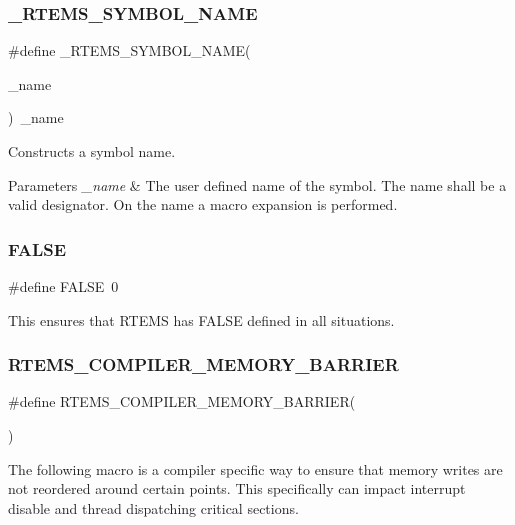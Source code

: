 \subsubsection{\texorpdfstring{\_RTEMS\_SYMBOL\_NAME}{\_RTEMS\_SYMBOL\_NAME}}
{\footnotesize\ttfamily \#define \+\_\+\+R\+T\+E\+M\+S\+\_\+\+S\+Y\+M\+B\+O\+L\+\_\+\+N\+A\+ME(\begin{DoxyParamCaption}\item[{}]{\+\_\+name }\end{DoxyParamCaption})~\+\_\+name}



Constructs a symbol name. 


\begin{DoxyParams}{Parameters}
{\em \+\_\+name} & The user defined name of the symbol. The name shall be a valid designator. On the name a macro expansion is performed. \\
\hline
\end{DoxyParams}
\mbox{\label{group__RTEMSScoreBaseDefs_gaa93f0eb578d23995850d61f7d61c55c1}} 
\subsubsection{\texorpdfstring{FALSE}{FALSE}}
{\footnotesize\ttfamily \#define F\+A\+L\+SE~0}

This ensures that R\+T\+E\+MS has F\+A\+L\+SE defined in all situations. \mbox{\label{group__RTEMSScoreBaseDefs_ga81cf73d35183e14fe3e08dffb62ec579}} 
\subsubsection{\texorpdfstring{RTEMS\_COMPILER\_MEMORY\_BARRIER}{RTEMS\_COMPILER\_MEMORY\_BARRIER}}
{\footnotesize\ttfamily \#define R\+T\+E\+M\+S\+\_\+\+C\+O\+M\+P\+I\+L\+E\+R\+\_\+\+M\+E\+M\+O\+R\+Y\+\_\+\+B\+A\+R\+R\+I\+ER(\begin{DoxyParamCaption}{ }\end{DoxyParamCaption})}

The following macro is a compiler specific way to ensure that memory writes are not reordered around certain points. This specifically can impact interrupt disable and thread dispatching critical sections. \mbox{\label{group__RTEMSScoreBaseDefs_gaa39ed3eb64c49d564b9c6a4700c872f8}} 
